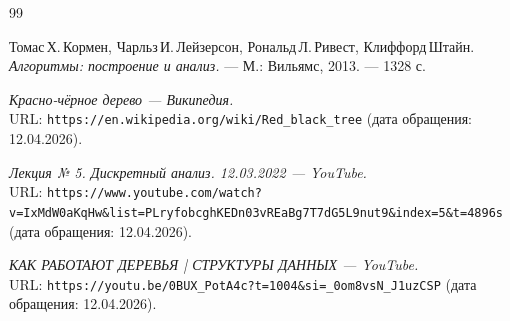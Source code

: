 \begin{thebibliography}{99}

Томас\,Х.\,Кормен, Чарльз\,И.\,Лейзерсон, Рональд\,Л.\,Ривест, Клиффорд\,Штайн.
{\itshape Алгоритмы: построение и анализ.} --- М.: Вильямс, 2013. --- 1328 с.

{\itshape Красно-чёрное дерево — Википедия.} \\
URL: \texttt{https://en.wikipedia.org/wiki/Red\_black\_tree} (дата обращения: 12.04.2026).

{\itshape Лекция № 5. Дискретный анализ. 12.03.2022 — YouTube.} \\
URL: \texttt{https://www.youtube.com/watch?v=IxMdW0aKqHw\&list=PLryfobcghKEDn03vREaBg7T7dG5L9nut9\&index=5\&t=4896s} (дата обращения: 12.04.2026).

{\itshape КАК РАБОТАЮТ ДЕРЕВЬЯ | СТРУКТУРЫ ДАННЫХ — YouTube.} \\
URL: \texttt{https://youtu.be/0BUX\_PotA4c?t=1004\&si=\_0om8vsN\_J1uzCSP} (дата обращения: 12.04.2026).

\end{thebibliography}
\pagebreak